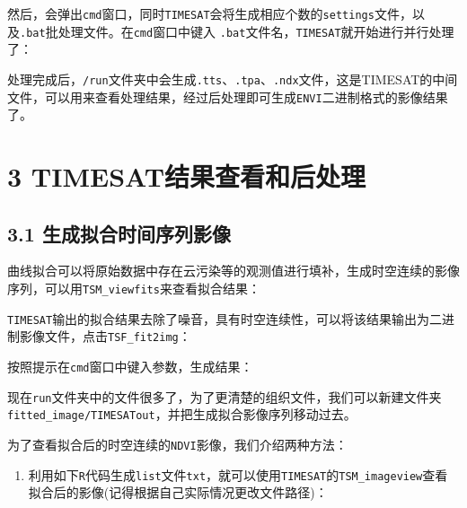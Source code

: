 \documentclass[
]{article}
\providecommand{\tightlist}{%
  \setlength{\itemsep}{0pt}\setlength{\parskip}{0pt}}
\begin{document}
然后，会弹出\texttt{cmd}窗口，同时\texttt{TIMESAT}会将生成相应个数的\texttt{settings}文件，以及\texttt{.bat}批处理文件。在\texttt{cmd}窗口中键入
\texttt{.bat}文件名，\texttt{TIMESAT}就开始进行并行处理了：

处理完成后，\texttt{/run}文件夹中会生成\texttt{.tts}、\texttt{.tpa}、\texttt{.ndx}文件，这是TIMESAT的中间文件，可以用来查看处理结果，经过后处理即可生成\texttt{ENVI}二进制格式的影像结果了。

\hypertarget{timesatux7ed3ux679cux67e5ux770bux548cux540eux5904ux7406}{%
\section{\texorpdfstring{\textbf{3
TIMESAT结果查看和后处理}}{3 TIMESAT结果查看和后处理}}\label{timesatux7ed3ux679cux67e5ux770bux548cux540eux5904ux7406}}

\hypertarget{ux751fux6210ux62dfux5408ux65f6ux95f4ux5e8fux5217ux5f71ux50cf}{%
\subsection{3.1
生成拟合时间序列影像}\label{ux751fux6210ux62dfux5408ux65f6ux95f4ux5e8fux5217ux5f71ux50cf}}

曲线拟合可以将原始数据中存在云污染等的观测值进行填补，生成时空连续的影像序列，可以用\texttt{TSM\_viewfits}来查看拟合结果：

\texttt{TIMESAT}输出的拟合结果去除了噪音，具有时空连续性，可以将该结果输出为二进制影像文件，点击\texttt{TSF\_fit2img}：

按照提示在\texttt{cmd}窗口中键入参数，生成结果：

现在\texttt{run}文件夹中的文件很多了，为了更清楚的组织文件，我们可以新建文件夹\texttt{fitted\_image/TIMESATout}，并把生成拟合影像序列移动过去。

为了查看拟合后的时空连续的\texttt{NDVI}影像，我们介绍两种方法：

\begin{enumerate}
\def\labelenumi{\arabic{enumi}.}
\tightlist
\item
  利用如下\texttt{R}代码生成\texttt{list}文件\texttt{txt}，就可以使用\texttt{TIMESAT}的\texttt{TSM\_imageview}查看拟合后的影像(记得根据自己实际情况更改文件路径)：
\end{enumerate}
\end{document}
